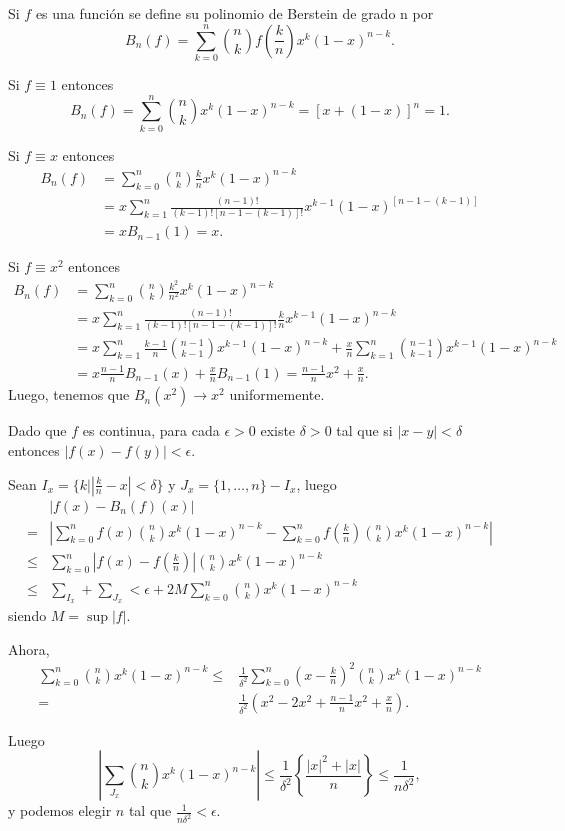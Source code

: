 \begin{definicion}{}
Si $f$ es una función se define su polinomio de Berstein de grado n por
\[
B_n(f)=\sum\limits_{k=0}^{n} {n \choose k} f\left(\frac{k}{n}\right) x^k (1-x)^{n-k}. 
\]
\end{definicion}

Si $f \equiv 1$ entonces 
\[
B_n(f)=\sum\limits_{k=0}^{n} {n \choose k} x^k (1-x)^{n-k} =[x+(1-x)]^n=1.
\]


Si $f\equiv x$ entonces 
\[\begin{split}
B_n(f)&=\sum\limits_{k=0}^{n} {n \choose k} \frac{k}{n} x^k (1-x)^{n-k} 
\\&=
x \sum\limits_{k=1}^{n} \frac{(n-1)!}{(k-1)![n-1-(k-1)]!}  x^{k-1} (1-x)^{[n-1-(k-1)]}
\\&=
x B_{n-1}(1)=x.
\end{split}
\]


Si $f\equiv x^2$ entonces 
\[
\begin{split}
B_n(f)
&=\sum\limits_{k=0}^{n} {n \choose k} \frac{k^2}{n^2} x^k (1-x)^{n-k} 
\\
&=
x \sum\limits_{k=1}^{n}  \frac{(n-1)!} {(k-1)![n-1-(k-1)]!} \frac{k}{n}  x^{k-1} (1-x)^{n-k}
\\
&=
x \sum\limits_{k=1}^{n}  \frac{k-1}{n} {{n-1} \choose{k-1}}  x^{k-1} (1-x)^{n-k}
+
\frac{x}{n} \sum\limits_{k=1}^{n} {{n-1 }\choose{k-1}}   x^{k-1} (1-x)^{n-k}
\\
&=
x \frac{n-1}{n} B_{n-1}(x) +  \frac{x}{n} B_{n-1}(1)=\frac{n-1}{n}x^2+\frac{x}{n}.
\end{split}
\]
Luego, tenemos que $B_n(x^2) \to x^2$ uniformemente.

Dado que $f$ es continua, para cada $\epsilon>0$  existe $\delta>0$ tal  que si $|x-y|<\delta$
entonces $|f(x)-f(y)|<\epsilon$.

Sean $I_{x}=\{ k| \left|\frac{k}{n}-x\right|<\delta \}$ y  $J_x=\{ 1,\dots,n\}-I_x$, luego
\[
\begin{split}
&|f(x)-B_n(f)(x)|
\\
=&\left|\sum\limits_{k=0}^n f(x){n \choose k} x^k (1-x)^{n-k}-
\sum\limits_{k=0}^n f\left(\frac{k}{n}\right){n \choose k} x^k (1-x)^{n-k}\right|
\\
\leq&
\sum\limits_{k=0}^n \left|f(x)-f\left(\frac{k}{n}\right)\right|{n \choose k} x^k (1-x)^{n-k}
\\
\leq 
&\sum\limits_{I_x}+\sum\limits_{J_x}<\epsilon+2M \sum\limits_{k=0}^n {n \choose k} x^k (1-x)^{n-k}
\end{split}
\]
siendo $M=\sup|f|$.

Ahora, 
\[
\begin{split}
\sum\limits_{k=0}^n {n \choose k} x^k (1-x)^{n-k}
\leq 
&\frac{1}{\delta^2} \sum\limits_{k=0}^n \left(x-\frac{k}{n}\right)^2 {n \choose k} x^k (1-x)^{n-k}
\\
=&
\frac{1}{\delta^2} \left(x^2-2x^2+\frac{n-1}{n}x^2+\frac{x}{n}\right).
\end{split}
\]

Luego
\[
\left|\sum\limits_{J_x} {n \choose k} x^k (1-x)^{n-k}
\right|
\leq \frac{1}{\delta^2}\left\{\frac{|x|^2+|x|}{n}\right\}\leq \frac{1}{n\delta^2},
\]
y podemos elegir $n$ tal que $\frac{1}{n \delta^2}<\epsilon$.

\newpage
